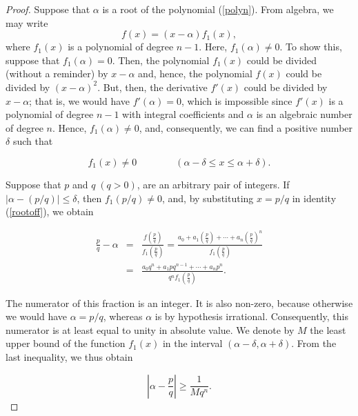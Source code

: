 \documentclass{article}
\begin{document}
\begin{proof}
Suppose that $\alpha$ is a root of the polynomial (\ref{polyn}). From algebra,
we may write
\begin{equation}
     f(x) = (x- \alpha)f_1(x),   \label{rootoff}
\end{equation}
where $f_1(x)$ is a polynomial of degree $n-1$. Here,  $f_1(\alpha) \ne 0$. To show this, suppose that
$f_1(\alpha) = 0$. Then, the polynomial $f_1(x)$ could be
divided (without a reminder) by $x-\alpha$ and, hence, the polynomial $f(x)$ could be divided by
$(x-\alpha)^2$. But, then, the derivative $f'(x)$ could be divided by $x-\alpha$; that is, we would have $f'(\alpha) = 0$, 
which is impossible since $f'(x)$ is a polynomial of degree $n-1$ with integral 
coefficients and $\alpha$ is an algebraic number of degree $n$. Hence, $f_1(\alpha) \ne 0$,
and, consequently, we can find a positive number $\delta$ such that

\begin{equation*}
    f_1(x) \ne 0   \qquad \qquad  (\alpha - \delta \leq  x \leq \alpha + \delta).
\end{equation*}

Suppose that $p$ and $q \; (q>0)$, are an arbitrary pair of integers. If
$|\alpha -(p/q)| \leq \delta$, then $f_1(p/q) \neq 0$, and, by substituting $x= p/q$ in identity (\ref{rootoff}), we obtain

\begin{eqnarray*}
    \frac{p}{q} - \alpha  & = & \frac{f\left(\frac{p}{q} \right)  }   { f_1\left( \frac{p}{q} \right)     } =
   \frac {
       a_0 + a_1 \left( \frac{p}{q}\right) + \cdots  +  a_n \left( \frac{p}{q}\right)^n
   }{
       f_1\left( \frac{p}{q} \right)   
   }  \\
  & = & \frac{
                a_0q^n + a_1pq^{n-1} + \cdots + a_np^n
            }{
                q^nf_1\left( \frac{p}{q}\right)
            }.
\end{eqnarray*}

The numerator of this fraction is an integer. It is also non-zero, because otherwise we would have $\alpha = p/q$, whereas
$\alpha$ is by hypothesis irrational. Consequently, this numerator is at least equal to unity in absolute value. We denote
by $M$ the least upper bound of the function $f_1(x)$ in the interval $(\alpha -\delta, \alpha + \delta)$. From the last 
inequality, we thus obtain

\begin{equation*}
   \left | \alpha - \frac{p}{q} \right | \ge  \frac{1}{Mq^n}.
\end{equation*}


\end{proof}
\end{document}
